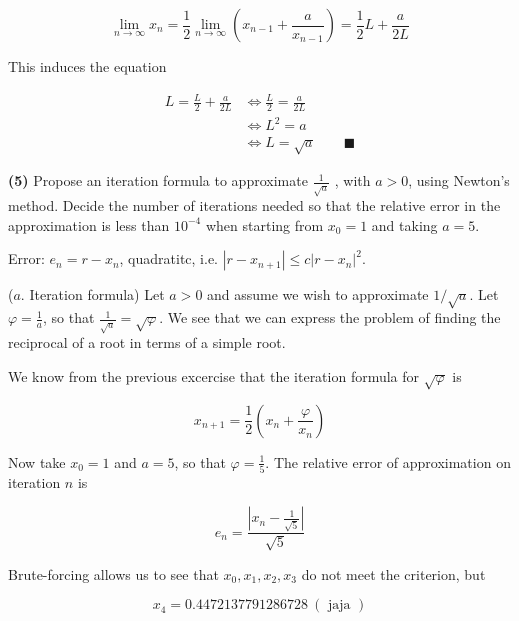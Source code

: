 \documentclass[12pt]{article}
\theoremstyle{definition}
\begin{document}
\begin{equation*}
    \lim_{n \to \infty} x_{n} = \frac{1}{2}\lim_{n \to \infty} \left( x_{n-1} +
    \frac{a}{x_{n-1}}\right) = \frac{1}{2}L + \frac{a}{2L}
\end{equation*}

This induces the equation 

\begin{align*}
    L = \frac{L}{2} + \frac{a}{2L} 
    &\iff \frac{L}{2} = \frac{a}{2L} \\ 
    &\iff L^2 = a\\
    &\iff L = \sqrt{a}  \qquad \blacksquare
\end{align*}

\pagebreak 

\begin{shaded}
    \textbf{(5)} Propose an iteration formula to approximate $\frac{1}{\sqrt{a}
    }$ , with $a > 0$, using Newton's method. Decide the number of iterations
    needed so that the relative error in the approximation is less than
    $10^{-4}$ when starting from $x_0 = 1$ and taking $a = 5$.
\end{shaded}

Error: $e_n = r - x_n$, quadratitc, i.e. $| r - x_{n+1}| \leq c |r - x_n|^2$.

($a$. Iteration formula) Let $a > 0$ and assume we wish to approximate $1 /
\sqrt{a} $. Let $\varphi = \frac{1}{a}$, so that $\frac{1}{\sqrt{a} } =
\sqrt{\varphi} $. We see that we can express the problem of finding the
reciprocal of a root in terms of a simple root.

We know from the previous excercise that the iteration formula for
$\sqrt{\varphi} $ is 

\begin{equation*}
    x_{n+1}=\frac{1}{2}\left( x_n + \frac{\varphi}{x_n} \right)  
\end{equation*}

Now take $x_{0} = 1$ and $a = 5$, so that
$\varphi = \frac{1}{5}$. The relative error of approximation on iteration $n$ is 

\begin{equation*}
    e_n = \frac{ \left| x_n - \frac{1}{\sqrt{5} } \right|  }{\sqrt{5} }
\end{equation*}

Brute-forcing allows us  to see that $x_0, x_1, x_2, x_3$ do not meet the criterion,
but 

\begin{equation*}
    x_4 = 0.4472137791286728 ~ (\text{ jaja } )
\end{equation*}
\end{document}
